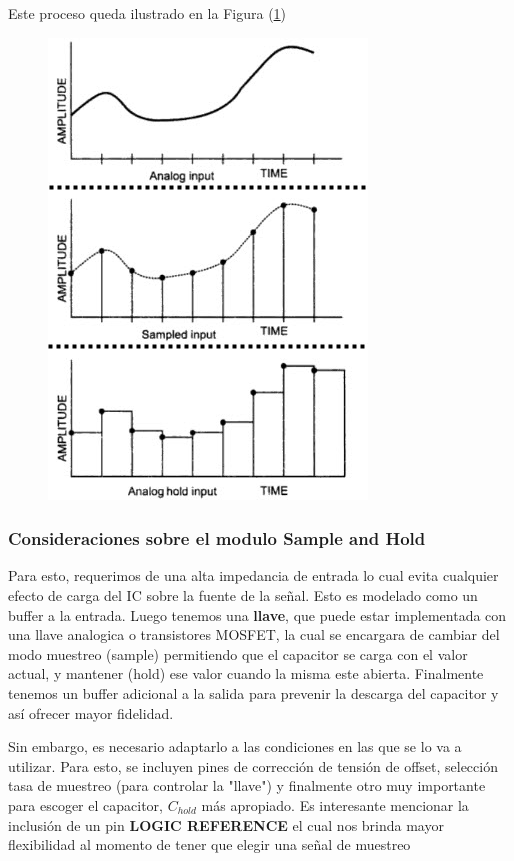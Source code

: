 Este proceso queda ilustrado en la Figura (\ref{fig:sh-circuit-waveform})
\begin{figure}[H]
	\centering
	\includegraphics[scale=0.5]{ImagenesEjercicio4/SH-Circuit-Waveform}
	\caption{}
	\label{fig:sh-circuit-waveform}
\end{figure}

\subsubsection{Consideraciones sobre el modulo Sample and Hold}
Para esto, requerimos de una alta impedancia de entrada lo cual evita cualquier efecto de carga del IC sobre la fuente de la señal. Esto es modelado como un buffer a la entrada. Luego tenemos una \textbf{llave}, que puede estar implementada con una llave analogica o transistores MOSFET, la cual se encargara de cambiar del modo muestreo (sample) permitiendo que el capacitor se carga con el valor actual, y mantener (hold) ese valor cuando la misma este abierta. Finalmente tenemos un buffer adicional a la salida para prevenir la descarga del capacitor y así ofrecer mayor fidelidad. 


 Sin embargo, es necesario adaptarlo a las condiciones en las que se lo va a utilizar. Para esto, se incluyen pines de corrección de tensión de offset, selección tasa de muestreo (para controlar la "llave") y finalmente otro muy importante para escoger el capacitor, $C_{hold}$ más apropiado.
 Es interesante mencionar la inclusión de un pin \textbf{LOGIC REFERENCE} el cual nos brinda mayor flexibilidad al momento de tener que elegir una señal de muestreo
